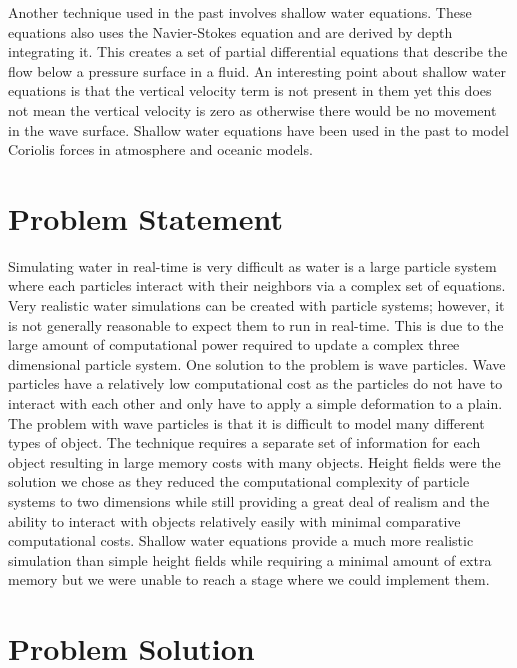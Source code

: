 \documentclass[11pt]{article}
\begin{document}
Another technique used in the past involves shallow water equations. These 
equations also uses the Navier-Stokes equation and are derived by depth 
integrating it. This creates a set of partial differential equations that 
describe the flow below a pressure surface in a fluid. An interesting point 
about shallow water equations is that the vertical velocity term is not present 
in them yet this does not mean the vertical velocity is zero as otherwise there 
would be no movement in the wave surface. Shallow water equations have been 
used in the past to model Coriolis forces in atmosphere and oceanic models. 
\cite{shalloweq}


\section{Problem Statement}

Simulating water in real-time is very difficult as water is a large particle 
system where each particles interact with their neighbors via a complex set of 
equations. Very realistic water simulations can be created with particle 
systems; however, it is not generally reasonable to expect them to run in 
real-time. This is due to the large amount of computational power required to 
update a complex three dimensional particle system. One solution to the problem 
is wave particles. Wave particles have a relatively low computational cost as 
the particles do not have to interact with each other and only have to apply a 
simple deformation to a plain. The problem with wave particles is that it is 
difficult to model many different types of object. The technique requires a 
separate set of information for each object resulting in large memory costs 
with many objects. Height fields were the solution we chose as they reduced the 
computational complexity of particle systems to two dimensions while still 
providing a great deal of realism and the ability to interact with objects 
relatively easily with minimal comparative computational costs. Shallow water 
equations provide a much more realistic simulation than simple height fields 
while requiring a minimal amount of extra memory but we were unable to reach a 
stage where we could implement them.
 
\section{Problem Solution}
\end{document}
